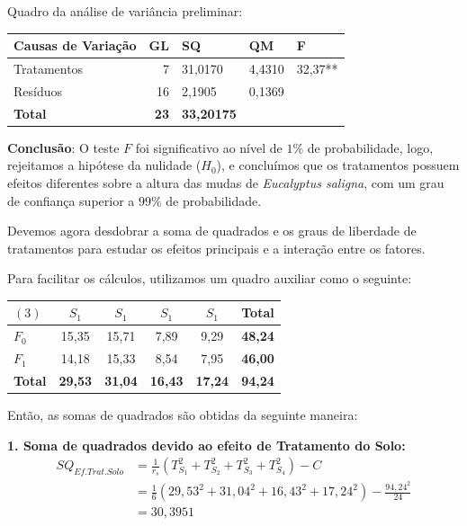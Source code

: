 \documentclass[
]{article}
\begin{document}
Quadro da análise de variância preliminar:

\begin{longtable}[t]{lrlll}
\toprule
Causas de Variação & GL & SQ & QM & F\\
\midrule
Tratamentos & 7 & 31,0170 & 4,4310 & 32,37**\\
Resíduos & 16 & 2,1905 & 0,1369 & \\
\textbf{Total} & \textbf{23} & \textbf{33,20175} & \textbf{} & \textbf{}\\
\bottomrule
\end{longtable}

\textbf{Conclusão}: O teste \(F\) foi significativo ao nível de \(1\%\)
de probabilidade, logo, rejeitamos a hipótese da nulidade (\(H_0\)), e
concluímos que os tratamentos possuem efeitos diferentes sobre a altura
das mudas de \emph{Eucalyptus saligna}, com um grau de confiança
superior a \(99\%\) de probabilidade.

Devemos agora desdobrar a soma de quadrados e os graus de liberdade de
tratamentos para estudar os efeitos principais e a interação entre os
fatores.

Para facilitar os cálculos, utilizamos um quadro auxiliar como o
seguinte:

\begin{longtable}[]{@{}lccccc@{}}
\toprule\noalign{}
\((3)\) & \(S_1\) & \(S_1\) & \(S_1\) & \(S_1\) & \textbf{Total} \\
\midrule\noalign{}
\endhead
\bottomrule\noalign{}
\endlastfoot
\(F_0\) & 15,35 & 15,71 & 7,89 & 9,29 & \textbf{48,24} \\
\(F_1\) & 14,18 & 15,33 & 8,54 & 7,95 & \textbf{46,00} \\
\textbf{Total} & \textbf{29,53} & \textbf{31,04} & \textbf{16,43} &
\textbf{17,24} & \textbf{94,24} \\
\end{longtable}

Então, as somas de quadrados são obtidas da seguinte maneira:

\textbf{1. Soma de quadrados devido ao efeito de Tratamento do Solo:} \[
\begin{aligned}
SQ_{Ef.Trat.Solo} &= \frac{1}{r_s}(T_{S_1}^2+T_{S_2}^2+T_{S_3}^2+T_{S_4}^2) - C \\
                  &= \frac{1}{6}(29,53^2+31,04^2+16,43^2+17,24^2) - \frac{94,24^2}{24} \\
                  &= 30,3951
\end{aligned}
\]
\end{document}
